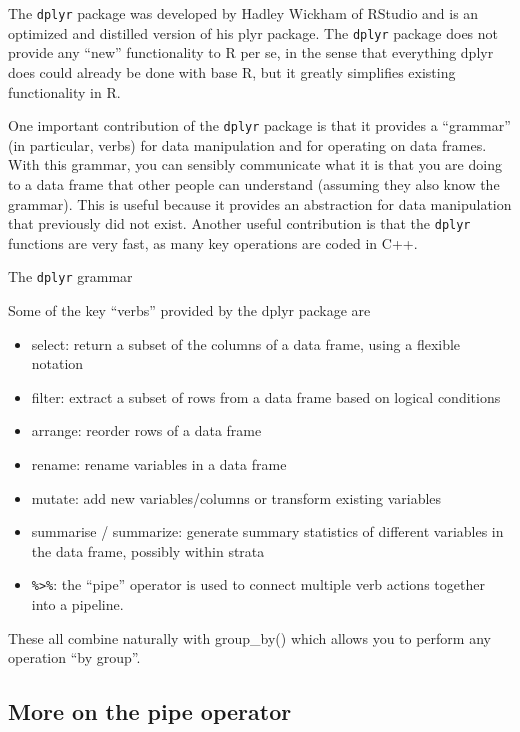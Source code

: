 \documentclass[
]{book}
\begin{document}
The \texttt{dplyr} package was developed by Hadley Wickham of RStudio and is an
optimized and distilled version of his plyr package. The \texttt{dplyr} package
does not provide any ``new'' functionality to R per se, in the sense that
everything dplyr does could already be done with base R, but it greatly
simplifies existing functionality in R.

One important contribution of the \texttt{dplyr} package is that it provides a
``grammar'' (in particular, verbs) for data manipulation and for operating
on data frames. With this grammar, you can sensibly communicate what it
is that you are doing to a data frame that other people can understand
(assuming they also know the grammar). This is useful because it
provides an abstraction for data manipulation that previously did not
exist. Another useful contribution is that the \texttt{dplyr} functions are
very fast, as many key operations are coded in C++.

The \texttt{dplyr} grammar

Some of the key ``verbs'' provided by the dplyr package are

\begin{itemize}
\item
  select: return a subset of the columns of a data frame, using a
  flexible notation
\item
  filter: extract a subset of rows from a data frame based on logical
  conditions
\item
  arrange: reorder rows of a data frame
\item
  rename: rename variables in a data frame
\item
  mutate: add new variables/columns or transform existing variables
\item
  summarise / summarize: generate summary statistics of different
  variables in the data frame, possibly within strata
\item
  \texttt{\%\textgreater{}\%}: the ``pipe'' operator is used to connect multiple verb actions
  together into a pipeline.
\end{itemize}

These all combine naturally with group\_by() which allows you to perform
any operation ``by group''.

\subsection*{More on the pipe operator}\label{more-on-the-pipe-operator}
\end{document}

